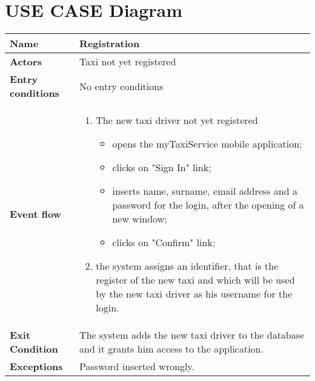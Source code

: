 \section{USE CASE Diagram}
\begin{tabular}{l l}
 \textbf {Name} & Registration  \\ \hline
 \textbf{Actors} & Taxi not yet registered \\ \hline
 \textbf{Entry conditions} & No entry conditions \\ \hline
 \textbf{Event flow} & 
 \parbox{0.9\textwidth}{
 \begin{enumerate}
 \item The new taxi driver not yet registered
    \begin{itemize}
    \item opens the myTaxiService mobile application;
    \item clicks on "Sign In" link;
    \item inserts name, surname, email address and a password for the login, after the opening of a new window;
    \item clicks on "Confirm" link;
    \end{itemize}
 \item the system assigns an identifier, that is the register of the new taxi and which will be used by the new taxi driver as his username for the login.
 \end{enumerate}
 } \\ \hline
 \textbf{Exit Condition} &  \parbox{0.9\textwidth}{The system adds the new taxi driver to the database and it grants him access to the application.} \\ \hline
 \textbf{Exceptions} & Password inserted wrongly.
\end{tabular}

